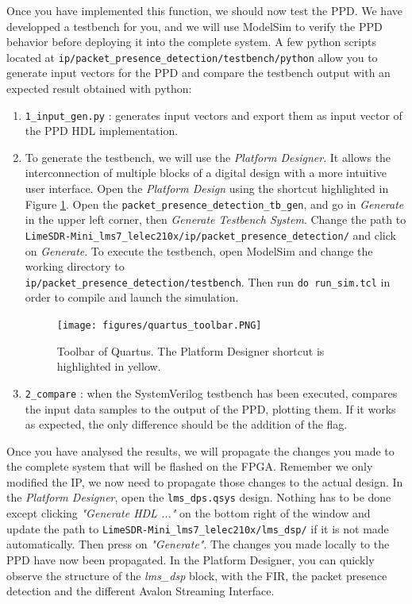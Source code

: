 Once you have implemented this function, we should now test the PPD. We have developped a testbench for you, and we will use ModelSim to verify the PPD behavior before deploying it into the complete system. A few python scripts located at \texttt{ip/packet\_presence\_detection/testbench/python} allow you to generate input vectors for the PPD and compare the testbench output with an expected result obtained with python:

\begin{enumerate}
    \item \texttt{1\_input\_gen.py} : generates input vectors and export them as input vector of the PPD HDL implementation.
    
    \item To generate the testbench, we will use the \textit{Platform Designer}. It allows the interconnection of multiple blocks of a digital design with a more intuitive user interface. Open the \textit{Platform Design} using the shortcut highlighted in Figure \ref{fig:quartus_platform_designer}. Open the \texttt{packet\_presence\_detection\_tb\_gen}, and go in \textit{Generate} in the upper left corner, then \textit{Generate Testbench System}. Change the path to \texttt{LimeSDR-Mini\_lms7\_lelec210x/ip/packet\_presence\_detection/} and click on \textit{Generate}. To execute the testbench, open ModelSim and change the working directory to\\ \texttt{ip/packet\_presence\_detection/testbench}. Then run \texttt{do run\_sim.tcl} in order to compile and launch the simulation.

\begin{figure}[H]
    \centering
    \texttt{[image: figures/quartus\_toolbar.PNG]}
    \caption{Toolbar of Quartus. The Platform Designer shortcut is highlighted in yellow.}
    \label{fig:quartus_platform_designer}
\end{figure}

    \item \texttt{2\_compare} : when the SystemVerilog testbench has been executed, compares the input data samples to the output of the PPD, plotting them. If it works as expected, the only difference should be the addition of the flag.
\end{enumerate}

Once you have analysed the results, we will propagate the changes you made to the complete system that will be flashed on the FPGA. Remember we only modified the IP, we now need to propagate those changes to the actual design. In the \textit{Platform Designer}, open the \texttt{lms\_dps.qsys} design. Nothing has to be done except clicking \textit{"Generate HDL ..."} on the bottom right of the window and update the path to
\texttt{LimeSDR-Mini\_lms7\_lelec210x/lms\_dsp/} if it is not made automatically. Then press on \textit{"Generate"}. The changes you made locally to the PPD have now been propagated. In the Platform Designer, you can quickly observe the structure of the \textit{lms\_dsp} block, with the FIR, the packet presence detection and the different Avalon Streaming Interface.


